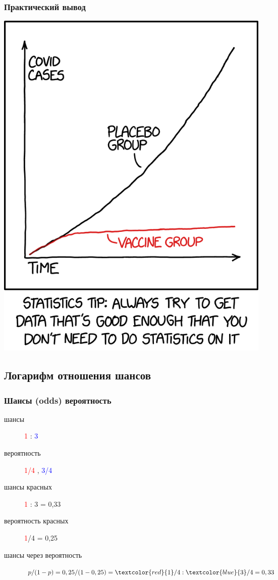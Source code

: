 \documentclass[svgnames]{beamer}
\begin{document}
\begin{frame}[standout]
  \frametitle{Практический вывод}
  \includegraphics[height=.8\textheight]{statistics_2x.png}
\end{frame}

\subsection{Логарифм отношения шансов}

\begin{frame}
  \frametitle{Шансы (odds)  вероятность}
  \Large
  \centering
  \begin{description}
  \item[шансы] \textcolor{red}{1} : \textcolor{blue}{3} 
  \item[вероятность] \textcolor{red}{1/4} , \textcolor{blue}{3/4}
  \item[шансы красных] \textcolor{red}{1} : 3 = 0,33
  \item[вероятность красных] \textcolor{red}{1}/4 = 0,25
    \pause
  \item[шансы через вероятность] $p/(1-p) = 0,25 / (1 - 0,25) =
    \textcolor{red}{1}/4 : \textcolor{blue}{3}/4 = 0,33$
  \end{description}  
\end{frame}
\end{document}
